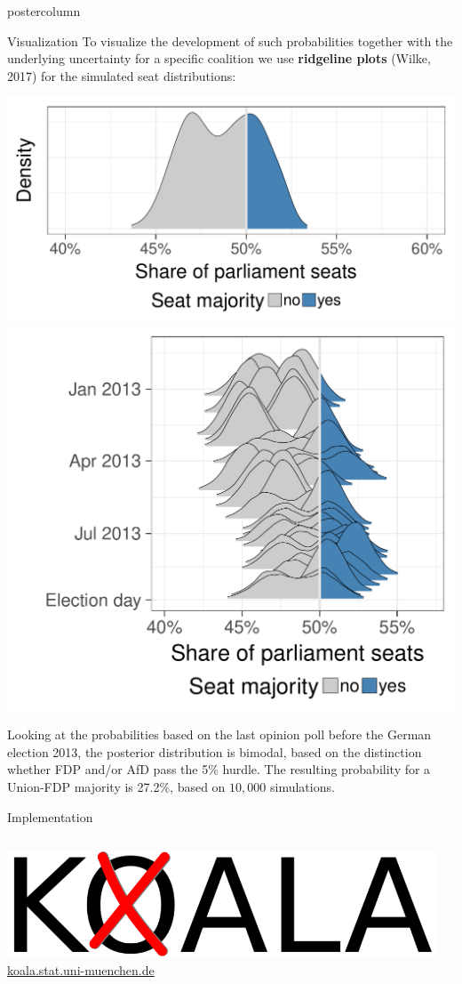 \documentclass[final,hyperref={pdfpagelabels=false}]{beamer}
\newcommand{\bfBlue}[1]{\textcolor{koaladarkestblue}{\textbf{#1}}}
\newcommand{\blue}[1]{\textcolor{koaladarkestblue}{#1}}
\newcommand*\circled[1]{\tikz[baseline=(char.base)]{
\node[shape=circle,draw,inner sep=2pt] (char) {#1};}}
\begin{document}
\begin{frame}
\begin{columns}
\begin{column}{1\textwidth}
\begin{columns}[T]
\begin{column}{.484\textwidth}
\begin{beamercolorbox}[center,wd=\textwidth]{postercolumn}
\begin{minipage}[T]{.95\textwidth}
\begin{block}{\footnotesize \circled{2} Visualization}
To visualize the development of such probabilities together with the underlying uncertainty for a specific coalition we use \bfBlue{ridgeline plots} (Wilke, 2017) for the simulated seat distributions:
\begin{center}\centering
\includegraphics[height=12ex]{figures/vis_seatDist}
\includegraphics[height=20ex]{figures/vis_seatDist_time}
\end{center}
Looking at the probabilities based on the last opinion poll before the German election 2013, the posterior distribution is bimodal, based on the distinction whether FDP and/or AfD pass the 5\% hurdle. The resulting probability for a Union-FDP majority is 27.2\%, based on $10,000$ simulations.
\end{block}


\begin{block}{\footnotesize \circled{3} Implementation}
\vspace{-3ex}
\begin{columns}[t]
  \begin{column}{.45\textwidth}
  \begin{center}\centering
  \includegraphics[height=3.5ex]{figures/Koala_Logo_ohneSchrift} \\
  \blue{\footnotesize \href{http://koala.stat.uni-muenchen.de}{koala.stat.uni-muenchen.de}}
  \end{center}
  \end{column}

  \hspace{-1.5ex}
  \textcolor{LMUlightgray}{\vrule{}}
  \hspace{1.5ex}


\end{columns}
\end{block}
\end{minipage}
\end{beamercolorbox}
\end{column}
\end{columns}
\end{column}
\end{columns}
\end{frame}
\end{document}
